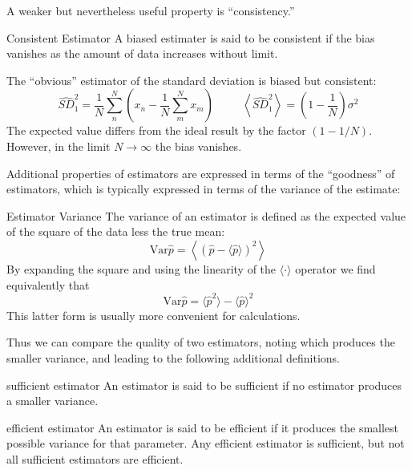 A weaker but nevertheless useful property is ``consistency.''
\begin{definition}{Consistent Estimator}
A biased estimater is said to be consistent if the bias vanishes as
the amount of data increases without limit.
\end{definition}

\begin{example}The ``obvious'' estimator of the standard deviation is
biased but consistent:
\begin{displaymath}
\hat{SD}_1^2 = \frac{1}{N} \sum_n^N \left(x_n - \frac{1}{N}\sum_m^N
x_m\right) \;\;\;\;\;\;\;\;\;
\left\langle \hat{SD}_1^2 \right\rangle = \left(1-\frac{1}{N}\right) \sigma^2
\end{displaymath}
The expected value differs from the ideal result by the
factor $(1 - 1/N)$.  However, in the limit $N\rightarrow\infty$ the bias
vanishes.
\end{example}


Additional properties of estimators are expressed in terms of the
``goodness'' of estimators, which is typically expressed in terms of
the variance of the estimate:
\begin{definition}{Estimator Variance}
The variance of an estimator is defined as the expected value of the
square of the data less the true mean:
\begin{displaymath}
\textrm{Var}\hat{p} = \left\langle \left(\hat{p} - \langle\hat{p} \rangle 
\right)^2 \right\rangle
\end{displaymath}
By expanding the square and using the linearity of the
$\langle\cdot\rangle$ operator we find equivalently that
\begin{displaymath}
\textrm{Var}\hat{p} = \langle\hat{p}^2\rangle - \langle \hat{p} \rangle^2
\end{displaymath}
This latter form is usually more convenient for calculations.
\end{definition}

Thus we can compare the quality of two estimators, noting which
produces the smaller variance, and leading to the following additional 
definitions.

\begin{definition}{sufficient estimator}
An estimator is said to be sufficient if no estimator produces a
smaller variance.
\end{definition}
\begin{definition}{efficient estimator}
An estimator is said to be efficient if it produces the smallest
possible variance for that parameter.  Any efficient estimator is
sufficient, but not all sufficient estimators are efficient.
\end{definition}

